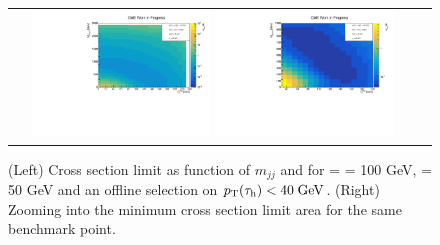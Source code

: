 \begin{figure}[tbh!]
	\centering
	\begin{tabular}{cc}
		\includegraphics[width=0.45\textwidth]{analysis/pics/JetInvMass_vs_MET_xsec_chi100_lsp050_taupt40.pdf}
		\includegraphics[width=0.45\textwidth]{analysis/pics/JetInvMass_vs_MET_xsec_chi100_lsp050_taupt40_zoom.pdf} 		
	\end{tabular}
	\caption{(Left) Cross section limit as function of $m_{jj}$ and \met for \charginopm = \neutralinotwo = 100 GeV, \neutralinoone = 50 GeV and an offline selection on $p_{\text{T}}(\tau_{\text{h}}) <  40\;\text{Ge}\kern-0.06667em\text{V}$. (Right) Zooming into the minimum cross section limit area for the same benchmark point.}
	\label{fig::JetInvMass_vs_MET_xsec_chi100_lsp050_taupt40}
\end{figure}

